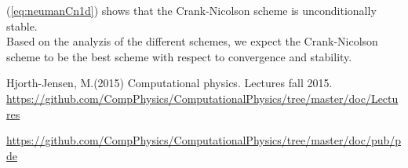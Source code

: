 \documentclass{article}
\begin{document}
(\ref{eq:neumanCn1d}) shows that the Crank-Nicolson scheme is unconditionally stable.\\

Based on the analyzis of the different schemes, we expect the Crank-Nicolson scheme to be the best scheme with respect to convergence and stability. 



\begin{thebibliography}{9}
	Hjorth-Jensen, M.(2015)
	Computational physics. Lectures fall 2015. 
	\url{https://github.com/CompPhysics/ComputationalPhysics/tree/master/doc/Lectures}
	
	\url{https://github.com/CompPhysics/ComputationalPhysics/tree/master/doc/pub/pde}

\end{thebibliography}
\end{document}
